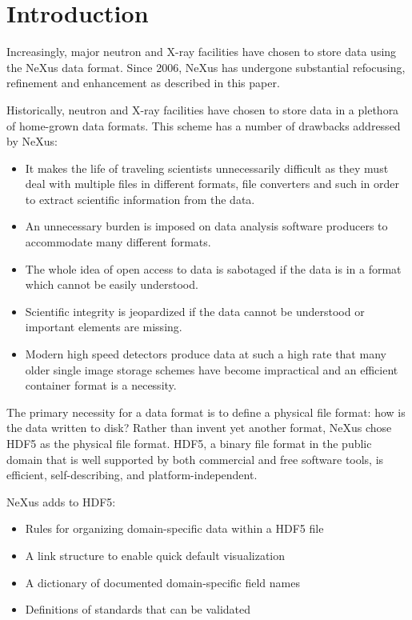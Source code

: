 \documentclass[%
 aip,
rsi,
 amsmath,amssymb,
 reprint,%
]{revtex4-1}
\begin{document}
\maketitle


\section{Introduction}
Increasingly, major neutron and X-ray facilities have chosen to store data using the NeXus data format. 
Since 2006, NeXus\cite{nxold} has undergone substantial refocusing, 
refinement and enhancement as described in this paper.  

Historically, neutron and X-ray facilities have chosen to store data in a plethora of 
home-grown data formats. This scheme has a number of drawbacks addressed by NeXus: 
\begin{itemize}
\item It makes the life of traveling scientists unnecessarily difficult as they must deal with multiple files 
 in different formats, file converters and such in order to extract scientific information from the data.
 \item An unnecessary burden is imposed on data analysis software producers to accommodate many different formats.  
\item The whole idea of open access to data is sabotaged if the data is in a format which cannot be easily understood.
\item Scientific integrity is jeopardized if the data cannot be understood or important elements are missing.
\item Modern high speed detectors produce data at such a high rate that many older single image storage schemes 
 have become impractical and 
 an efficient container format is a necessity. 
\end{itemize}

The primary necessity for a data format is to define a physical file format: how is the data written to disk? Rather than invent
yet another format, NeXus chose HDF5\cite{hdf5} as the physical file format. 
HDF5, a binary file format in the public domain that is well supported by both commercial and free software tools, 
is efficient, self-describing, and platform-independent.

NeXus adds to HDF5:
\begin{itemize}
\item Rules for organizing domain-specific data within a HDF5 file
\item A link structure to enable quick default visualization
\item A dictionary of documented domain-specific field names
\item Definitions of standards that can be validated
\end{itemize}
\end{document}
